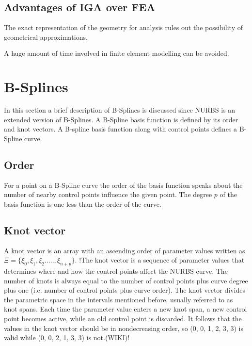 \documentclass[12pt]{article}
\begin{document}
\subsection{Advantages of IGA over FEA}
\begin{description}[leftmargin=*]
	\item[$\bullet$]   The exact representation of the geometry for analysis rules out the possibility of geometrical approximations.
	\item[$\bullet$]   A huge amount of time involved in finite element modelling can be avoided.
\end{description}

\section{B-Splines } \label{BSplines}
In this section a brief description of B-Splines is discussed since NURBS is an extended version of B-Splines. A B-Spline basis function is defined by its order and knot vectors. A B-spline basis function along with control points defines a B-Spline curve.
\subsection{Order }
For a point on a B-Spline curve the order of the basis function speaks about the number of nearby control points influence the given point. The degree $p$ of the basis function is one less than the order of the curve.

\subsection{Knot vector }
A knot vector is an array with an ascending order of parameter values written as $\Xi = \{ \xi_0,\xi_1,\xi_2.....,\xi_{n+p}\}$.
!The knot vector is a sequence of parameter values that determines where and how the control points affect the NURBS curve. The number of knots is always equal to the number of control points plus curve degree plus one (i.e. number of control points plus curve order). The knot vector divides the parametric space in the intervals mentioned before, usually referred to as knot spans. Each time the parameter value enters a new knot span, a new control point becomes active, while an old control point is discarded. It follows that the values in the knot vector should be in nondecreasing order, so (0, 0, 1, 2, 3, 3) is valid while (0, 0, 2, 1, 3, 3) is not.(WIKI)!
\end{document}
